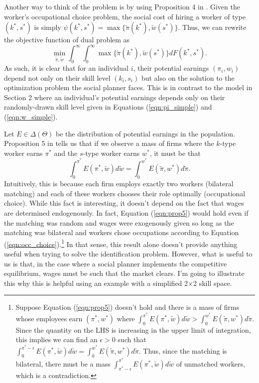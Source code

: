 \documentclass[12 pt]{article}
\begin{document}
Another way to think of the problem is by using Proposition 4 in \citet{mak2025occupational}. Given the worker's occupational choice problem, the social cost of hiring a worker of type $(k^*,s^*)$ is simply $\psi(k^*,s^*) = \max\{\tilde{\pi}(k^*),\tilde{w}(s^*)\}$. Thus, we can rewrite the objective function of dual problem as
\begin{equation}
	\min_{\tilde{\pi},\tilde{w}} \int_0^\infty \int_0^\infty \max\{\tilde{\pi}(k^*),\tilde{w}(s^*)\} dF(k^*,s^*).
	\label{eqn:spp}
\end{equation}
As such, it is clear that for an individual $i$, their potential earnings $(\pi_i,w_i)$ depend not only on their skill level $(k_i,s_i)$ but also on the solution to the optimization problem the social planner faces. This is in contrast to the model in Section 2 where an individual's potential earnings depends only on their randomly-drawn skill level given in Equations (\ref{eqn:pi_simple}) and (\ref{eqn:w_simple}).

Let $E \in \Delta(\Theta)$ be the distribution of potential earnings in the population. Proposition 5 in \citet{mak2025occupational} tells us that if we observe a mass of firms where the $k$-type worker earns $\pi^*$ and the $s$-type worker earns $w^*$, it must be that
\begin{equation}
	\int_0^{\pi^*} E(\pi^*,\tilde{w}) d\tilde{w} = \int_0^{w^*} E(\tilde{\pi},w^*) d \tilde{\pi}.
	\label{eqn:prop5}
\end{equation}
Intuitively, this is because each firm employs exactly two workers (bilateral matching) and each of these workers chooses their role optimally (occupational choice). While this fact is interesting, it doesn't depend on the fact that wages are determined endogenously. In fact, Equation (\ref{eqn:prop5}) would hold even if the matching was random and wages were exogenously given so long as the matching was bilateral and workers chose occupations according to Equation (\ref{eqn:occ_choice}).\footnote{Suppose Equation (\ref{eqn:prop5}) doesn't hold and there is a mass of firms whose employees earn $(\pi^*,w^*)$ where $\int_0^{\pi^*} E(\pi^*,\tilde{w}) d\tilde{w} > \int_0^{w^*} E(\tilde{\pi},w^*) d \tilde{\pi}$. Since the quantity on the LHS is increasing in the upper limit of integration, this implies we can find an $\epsilon > 0$ such that $\int_0^{\pi^*-\epsilon} E(\pi^*,\tilde{w}) d\tilde{w} = \int_0^{w^*} E(\tilde{\pi},w^*) d \tilde{\pi}$. Thus, since the matching is bilateral, there must be a mass $\int_{\pi^*-\epsilon}^{\pi^*} E(\pi^*,\tilde{w}) d\tilde{w}$ of unmatched workers, which is a contradiction. } In that sense, this result alone doesn't provide anything useful when trying to solve the identification problem. However, what is useful to us is that, in the case where a social planner implements the competitive equilibrium, wages must be such that the market clears. I'm going to illustrate this why this is helpful using an example with a simplified 2$\times$2 skill space.
\end{document}

